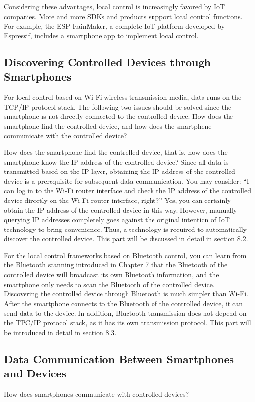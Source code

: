 \documentclass[a4paper,12pt,openany]{book}
\begin{document}
Considering these advantages, local control is increasingly favored by IoT companies. More and more SDKs and products support local control functions. For example, the ESP RainMaker, a complete IoT platform developed by Espressif, includes a smartphone app to implement local control.

\subsection{Discovering Controlled Devices through Smartphones}
For local control based on Wi-Fi wireless transmission media, data runs on the TCP/IP protocol stack. The following two issues should be solved since the smartphone is not directly connected to the controlled device. How does the smartphone find the controlled device, and how does the smartphone communicate with the controlled device?

How does the smartphone find the controlled device, that is, how does the smartphone know the IP address of the controlled device? Since all data is transmitted based on the IP layer, obtaining the IP address of the controlled device is a prerequisite for subsequent data communication. You may consider: “I can log in to the Wi-Fi router interface and check the IP address of the controlled device directly on the Wi-Fi router interface, right?” Yes, you can certainly obtain the IP address of the controlled device in this way. However, manually querying IP addresses completely goes against the original intention of IoT technology to bring convenience. Thus, a technology is required to automatically discover the controlled device. This part will be discussed in detail in section 8.2.

For the local control frameworks based on Bluetooth control, you can learn from the Bluetooth scanning introduced in Chapter 7 that the Bluetooth of the controlled device will broadcast its own Bluetooth information, and the smartphone only needs to scan the Bluetooth of the controlled device. Discovering the controlled device through Bluetooth is much simpler than Wi-Fi. After the smartphone connects to the Bluetooth of the controlled device, it can send data to the device. In addition, Bluetooth transmission does not depend on the TPC/IP protocol stack, as it has its own transmission protocol. This part will be introduced in detail in section 8.3.

\subsection{Data Communication Between Smartphones and Devices}
How does smartphones communicate with controlled devices?
\end{document}
